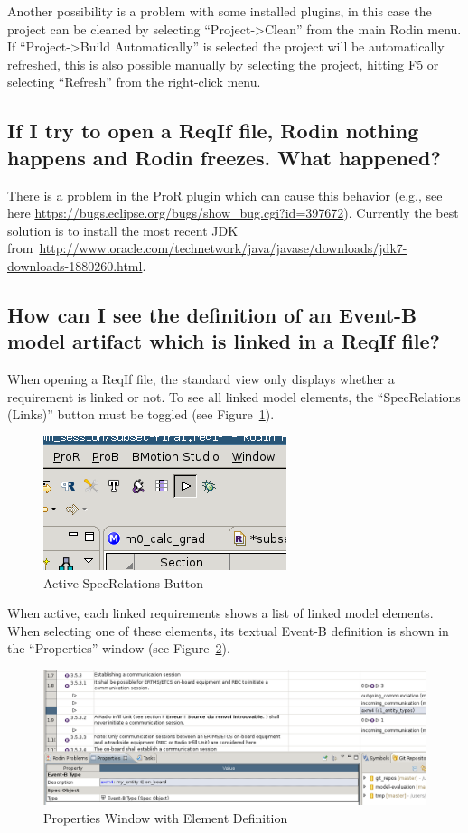 \documentclass[10pt,a4paper]{article}
\begin{document}
Another possibility is a problem with some installed plugins, in this case the
project can be cleaned by selecting ``Project->Clean'' from the main Rodin
menu. If  ``Project->Build Automatically'' is selected the project will be
automatically refreshed, this is also possible manually by selecting the
project, hitting F5 or selecting ``Refresh'' from the right-click menu.

\subsection{If I try to open a ReqIf file, Rodin nothing happens and Rodin
  freezes. What happened?}
\label{sec:if-i-try}

There is a problem in the ProR plugin which can cause this behavior (e.g., see
here \url{https://bugs.eclipse.org/bugs/show_bug.cgi?id=397672}). Currently
the best solution is to install the most recent JDK
from~\url{http://www.oracle.com/technetwork/java/javase/downloads/jdk7-downloads-1880260.html}.

\subsection{How can I see the definition of an Event-B model artifact which is
  linked in a ReqIf file?}
\label{sec:how-can-i}


When opening a ReqIf file, the standard view only displays whether a
requirement is linked or not. To see all linked model elements, the
``SpecRelations (Links)'' button must be toggled (see
Figure~\ref{fig:spec-relations-button}).

\begin{figure}[H]
  \centering
  \includegraphics[width=.35\textwidth]{ProR-Link-Toggle}
  \caption{Active SpecRelations Button}
  \label{fig:spec-relations-button}
\end{figure}

When active, each linked requirements shows a list of linked model
elements. When selecting one of these elements, its textual Event-B definition
is shown in the ``Properties'' window (see
Figure~\ref{fig:properties-window-element}).

\begin{figure}[H]
  \centering
  \includegraphics[width=\textwidth]{ProR-Link-View}
  \caption{Properties Window with Element Definition}
  \label{fig:properties-window-element}
\end{figure}
\end{document}

